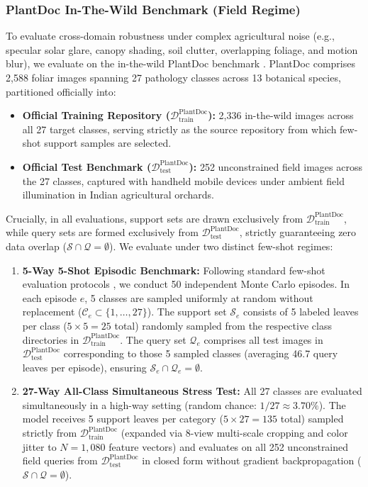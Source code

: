 \documentclass[a4paper,fleqn,nologo]{cas-dc}
\begin{document}
\subsubsection{PlantDoc In-The-Wild Benchmark (Field Regime)}
To evaluate cross-domain robustness under complex agricultural noise (e.g., specular solar glare, canopy shading, soil clutter, overlapping foliage, and motion blur), we evaluate on the in-the-wild PlantDoc benchmark \cite{singh2020plantdoc}. PlantDoc comprises 2,588 foliar images spanning 27 pathology classes across 13 botanical species, partitioned officially into:
\begin{itemize}
    \item \textbf{Official Training Repository ($\mathcal{D}_{\text{train}}^{\text{PlantDoc}}$):} 2,336 in-the-wild images across all 27 target classes, serving strictly as the source repository from which few-shot support samples are selected.
    \item \textbf{Official Test Benchmark ($\mathcal{D}_{\text{test}}^{\text{PlantDoc}}$):} 252 unconstrained field images across the 27 classes, captured with handheld mobile devices under ambient field illumination in Indian agricultural orchards.
\end{itemize}
Crucially, in all evaluations, support sets are drawn exclusively from $\mathcal{D}_{\text{train}}^{\text{PlantDoc}}$, while query sets are formed exclusively from $\mathcal{D}_{\text{test}}^{\text{PlantDoc}}$, strictly guaranteeing zero data overlap ($\mathcal{S} \cap \mathcal{Q} = \emptyset$). We evaluate under two distinct few-shot regimes:
\begin{enumerate}
    \item \textbf{5-Way 5-Shot Episodic Benchmark:} Following standard few-shot evaluation protocols \cite{snell2017prototypical,zhou2026vsf}, we conduct 50 independent Monte Carlo episodes. In each episode $e$, 5 classes are sampled uniformly at random without replacement ($\mathcal{C}_e \subset \{1, \dots, 27\}$). The support set $\mathcal{S}_e$ consists of 5 labeled leaves per class ($5 \times 5 = 25$ total) randomly sampled from the respective class directories in $\mathcal{D}_{\text{train}}^{\text{PlantDoc}}$. The query set $\mathcal{Q}_e$ comprises all test images in $\mathcal{D}_{\text{test}}^{\text{PlantDoc}}$ corresponding to those 5 sampled classes (averaging 46.7 query leaves per episode), ensuring $\mathcal{S}_e \cap \mathcal{Q}_e = \emptyset$.
    \item \textbf{27-Way All-Class Simultaneous Stress Test:} All 27 classes are evaluated simultaneously in a high-way setting (random chance: $1/27 \approx 3.70\%$). The model receives 5 support leaves per category ($5 \times 27 = 135$ total) sampled strictly from $\mathcal{D}_{\text{train}}^{\text{PlantDoc}}$ (expanded via 8-view multi-scale cropping and color jitter to $N = 1{,}080$ feature vectors) and evaluates on all 252 unconstrained field queries from $\mathcal{D}_{\text{test}}^{\text{PlantDoc}}$ in closed form without gradient backpropagation ($\mathcal{S} \cap \mathcal{Q} = \emptyset$).
\end{enumerate}
\end{document}
